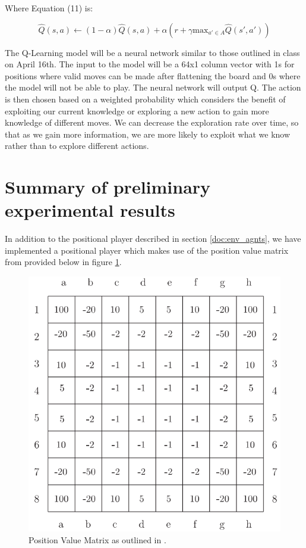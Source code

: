 \documentclass{article}
\begin{document}
\noindent Where Equation (11) is:

\begin{equation}
    \hat{Q}(s, a) \leftarrow (1-\alpha)\hat{Q}(s,a) + \alpha\left(r+\gamma \text{max}_{a'\in A}\hat{Q}(s', a')\right)
\end{equation}


\noindent The Q-Learning model will be a neural network similar to those outlined in class on April 16th. The input to the model will be a 64x1 column vector with 1s for positions where valid moves can be made after flattening the board and 0s where the model will not be able to play.
The neural network will output Q. 
The action is then chosen based on a weighted probability which considers the benefit of exploiting our current knowledge or exploring a new action to gain more knowledge of different moves. We can decrease the exploration rate over time, so that as we gain more information, we are more likely to exploit what we know rather than to explore different actions.

\section{Summary of preliminary experimental results}
In addition to the positional player described in section \ref{doc:env_agnts}, we have implemented a positional player which makes use of the position value matrix from \cite{vanEck2008} provided below in figure \ref{fig:pos_vals}.

\begin{figure}[ht]
\centering
\includegraphics[width=0.6\linewidth]{position_vals.png}
\caption{\label{fig:pos_vals}Position Value Matrix as outlined in \cite{vanEck2008}.}
\end{figure}
\end{document}
